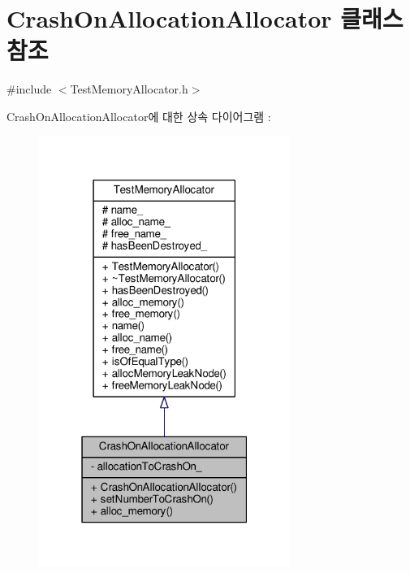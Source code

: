 \hypertarget{class_crash_on_allocation_allocator}{}\section{Crash\+On\+Allocation\+Allocator 클래스 참조}
\label{class_crash_on_allocation_allocator}


{\ttfamily \#include $<$Test\+Memory\+Allocator.\+h$>$}



Crash\+On\+Allocation\+Allocator에 대한 상속 다이어그램 \+: 
\nopagebreak
\begin{figure}[H]
\begin{center}
\leavevmode
\includegraphics[width=232pt]{class_crash_on_allocation_allocator__inherit__graph}
\end{center}
\end{figure}


